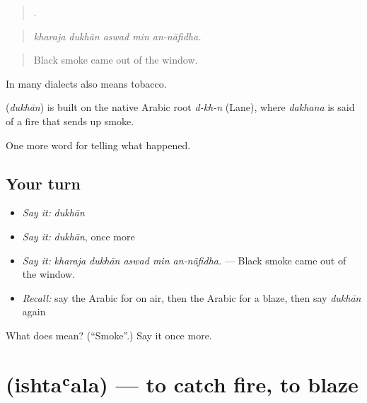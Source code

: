 \begin{quote}
    .
\end{quote}

\begin{quote}
\emph{kharaja dukhān aswad min an-nāfidha.}
\end{quote}

\begin{quote}
Black smoke came out of the window.
\end{quote}

In many dialects  also means tobacco.

\begin{cousinweb}
\textbf{} (\emph{dukhān}) is built on the native Arabic root \emph{d-kh-n} (Lane), where \emph{dakhana} is said of a fire that sends up smoke.
\end{cousinweb}

\begin{grammarlens}[title={What you've built}]
One more word for telling what happened.
\end{grammarlens}

\subsection*{Your turn}
\begin{itemize}
\raggedright
  \item \emph{Say it:} \emph{dukhān}
  \item \emph{Say it:} \emph{dukhān}, once more
  \item \emph{Say it:} \emph{kharaja dukhān aswad min an-nāfidha.} — Black smoke came out of the window.
  \item \emph{Recall:} say the Arabic for on air, then the Arabic for a blaze, then say \emph{dukhān} again
\end{itemize}

\begin{tcolorbox}[breakable,colback=teal!4,colframe=teal!35!black,title={Before you move on}]
What does  mean? (\textquotedblleft{}Smoke\textquotedblright{}.) Say it once more.
\end{tcolorbox}
\section[\texorpdfstring{\ar{اشتعل} (ishtaʿala)}{اشتعل (ishtaʿala)}]{ (ishtaʿala) — to catch fire, to blaze}


